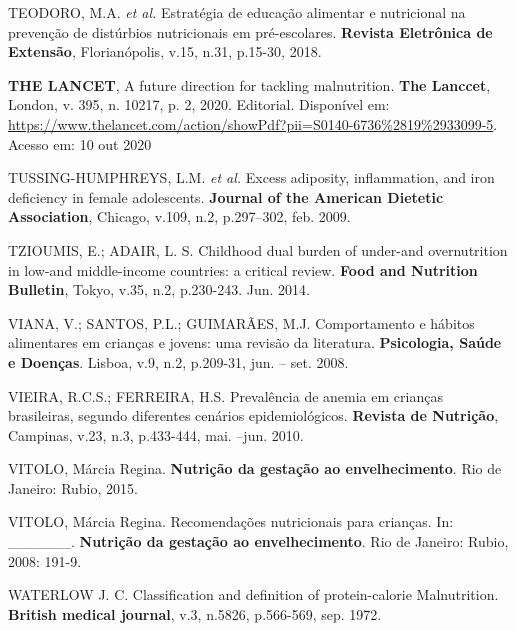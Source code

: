 \noindent TEODORO, M.A. \textit{et al.} Estratégia de educação alimentar e nutricional na prevenção de distúrbios nutricionais em pré-escolares. \textbf{Revista Eletrônica de Extensão}, Florianópolis, v.15, n.31, p.15-30, 2018.

\bigbreak

\noindent \textbf{THE LANCET}, A future direction for tackling malnutrition. \textbf{The Lanccet}, London, v. 395, n. 10217, p. 2, 2020. Editorial. Disponível em: \url{https://www.thelancet.com/action/showPdf?pii=S0140-6736\%2819\%2933099-5}. Acesso em: 10 out 2020

\bigbreak

\noindent TUSSING-HUMPHREYS, L.M. \textit{et al.} Excess adiposity, inflammation, and iron deficiency in female adolescents. \textbf{Journal of the American Dietetic Association}, Chicago, v.109, n.2, p.297–302, feb. 2009. 

\bigbreak

\noindent TZIOUMIS, E.; ADAIR, L. S. Childhood dual burden of under-and overnutrition in low-and middle-income countries: a critical review. \textbf{Food and Nutrition Bulletin}, Tokyo, v.35, n.2, p.230-243. Jun. 2014.

\bigbreak

\noindent VIANA, V.; SANTOS, P.L.; GUIMARÃES, M.J. Comportamento e hábitos alimentares em crianças e jovens: uma revisão da literatura. \textbf{Psicologia, Saúde e Doenças}. Lisboa, v.9, n.2, p.209-31, jun. – set. 2008.

\bigbreak

\noindent VIEIRA, R.C.S.; FERREIRA, H.S. Prevalência de anemia em crianças brasileiras, segundo diferentes cenários epidemiológicos. \textbf{Revista de Nutrição}, Campinas, v.23, n.3, p.433-444, mai. –jun. 2010.

\bigbreak

\noindent VITOLO, Márcia Regina. \textbf{Nutrição da gestação ao envelhecimento}. Rio de Janeiro: Rubio, 2015.

\bigbreak

\noindent VITOLO, Márcia Regina. Recomendações nutricionais para crianças. In: \_\_\_\_\_\_. \textbf{Nutrição da gestação ao envelhecimento}. Rio de Janeiro: Rubio, 2008: 191-9.

\bigbreak

\noindent WATERLOW J. C. Classification and definition of protein-calorie Malnutrition. \textbf{British medical journal}, v.3, n.5826, p.566-569, sep. 1972.

\bigbreak

